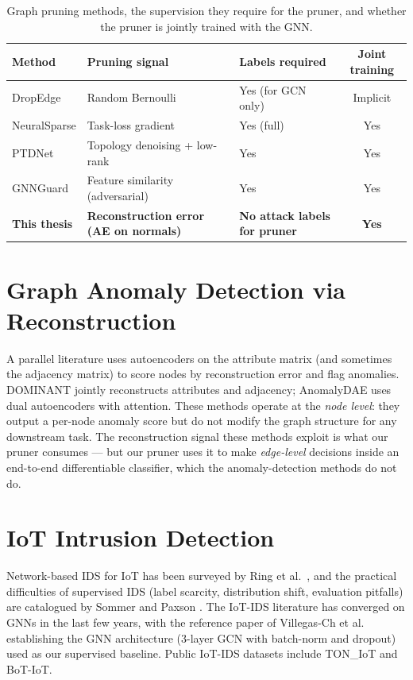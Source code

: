 \documentclass[11pt,a4paper]{report}
\theoremstyle{definition}
\theoremstyle{remark}
\begin{document}
\begin{table}[h]
\centering
\caption{Graph pruning methods, the supervision they require for the
pruner, and whether the pruner is jointly trained with the GNN.}
\label{tab:related-pruning}
\small
\begin{tabular}{lllc}
\toprule
\textbf{Method} & \textbf{Pruning signal} & \textbf{Labels required} & \textbf{Joint training} \\
\midrule
DropEdge \cite{rong2020dropedge}            & Random Bernoulli         & Yes (for GCN only) & Implicit \\
NeuralSparse \cite{zheng2020neuralsparse}   & Task-loss gradient       & Yes (full)         & Yes \\
PTDNet \cite{luo2021ptdnet}                 & Topology denoising + low-rank & Yes           & Yes \\
GNNGuard \cite{zhang2020gnnguard}           & Feature similarity (adversarial) & Yes      & Yes \\
\textbf{This thesis}                        & \textbf{Reconstruction error (AE on normals)} & \textbf{No attack labels for pruner} & \textbf{Yes} \\
\bottomrule
\end{tabular}
\end{table}

\section{Graph Anomaly Detection via Reconstruction}

A parallel literature uses autoencoders on the attribute matrix (and
sometimes the adjacency matrix) to score nodes by reconstruction error
and flag anomalies. DOMINANT \cite{ding2019dominant} jointly
reconstructs attributes and adjacency; AnomalyDAE \cite{fan2020anomalydae}
uses dual autoencoders with attention. These methods operate at the
\emph{node level}: they output a per-node anomaly score but do not
modify the graph structure for any downstream task. The reconstruction
signal these methods exploit is what our pruner consumes --- but our
pruner uses it to make \emph{edge-level} decisions inside an
end-to-end differentiable classifier, which the anomaly-detection
methods do not do.

\section{IoT Intrusion Detection}

Network-based IDS for IoT has been surveyed by Ring et al.\
\cite{ring2019survey}, and the practical difficulties of supervised
IDS (label scarcity, distribution shift, evaluation pitfalls) are
catalogued by Sommer and Paxson \cite{sommer2010outside}. The IoT-IDS
literature has converged on GNNs in the last few years, with the
reference paper of Villegas-Ch et al.\ \cite{villegas2023gnn} establishing
the GNN architecture (3-layer GCN with batch-norm and dropout) used as
our supervised baseline. Public IoT-IDS datasets include TON\_IoT
\cite{moustafa2020toniot} and BoT-IoT.
\end{document}
